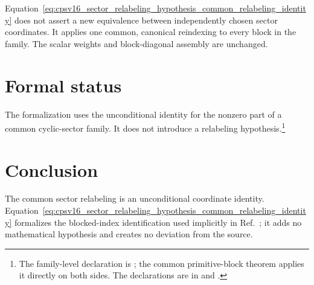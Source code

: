 \documentclass{article}
\begin{document}
Equation~\ref{eq:cpsv16_sector_relabeling_hypothesis_common_relabeling_identity}
does not assert a new equivalence between independently chosen sector
coordinates. It applies one common, canonical reindexing to every block in the
family. The scalar weights and block-diagonal assembly are unchanged.

\section{Formal status}

The formalization uses the unconditional identity for the nonzero part of a
common cyclic-sector family. It does not introduce a relabeling
hypothesis.\footnote{The family-level declaration is
; the common
primitive-block theorem applies it directly on both sides. The declarations
are in
and
.}

\section{Conclusion}

The common sector relabeling is an unconditional coordinate identity.
Equation~\ref{eq:cpsv16_sector_relabeling_hypothesis_common_relabeling_identity}
formalizes the blocked-index identification used implicitly in
Ref.~\cite{Cirac2016MPDO_arXiv}; it adds no mathematical hypothesis and creates
no deviation from the source.



\end{document}
